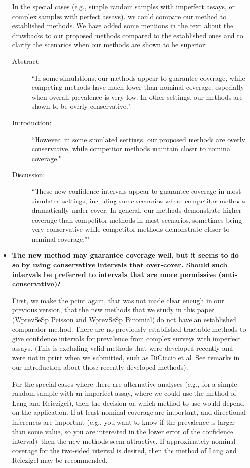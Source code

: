 \documentclass[11pt]{article}
\begin{document}
\begin{itemize}
In the special cases (e.g., simple random samples with imperfect 
assays, or complex samples with perfect assays), we could compare our method to established methods. 
    We have added some mentions in the text about the drawbacks to our proposed methods compared to the established ones and to clarify the scenarios when our methods are shown to be superior:
    
    \begin{description}
\item[    Abstract:]
    ``In some simulations, our methods appear to guarantee coverage, while competing methods have much lower than nominal coverage, especially when overall prevalence is very low. In other settings, our methods are shown to be overly conservative."
    
\item[    Introduction:]
    
    ``However, in some simulated settings, our proposed methods are overly conservative, while competitor methods maintain closer to nominal coverage."

\item[    Discussion:]
    ``These new confidence intervals appear to guarantee coverage in most simulated settings, including some scenarios where competitor methods dramatically under-cover.
    In general, our methods demonstrate higher coverage than competitor methods in most scenarios, sometimes being very conservative while competitor methods demonstrate closer to nominal coverage.""
\end{description}

    \item \textbf{The new method may guarantee coverage well, but it seems to do so by using conservative intervals that over-cover. Should such intervals be preferred to intervals that are more permissive (anti-conservative)?}
    
  First, we make the point again, that was not made clear enough in our previous version, that the new methods that we study in this paper (WprevSeSp Poisson and WprevSeSp Binomial)
do not have an established comparator method.
There are no previously established tractable methods to give confidence intervals for prevalence from complex surveys with imperfect assays.
(This is excluding valid methods that were developed recently and were not in print when we submitted, such as DiCiccio et al.
See remarks in our introduction about those recently developed methods).

For the special cases where there are alternative analyses (e.g., for a simple random sample with an imperfect assay, where we could use the method of Lang and Reiczigel), then the decision on which method to use would depend on the application.
If at least nominal coverage are important, and directional inferences are important (e.g., you want to know if the prevalence is larger than some value, so you are interested in the lower error of the confidence interval), then the new methods seem attractive.
If approximately nominal coverage for the two-sided interval is desired, then the method of Lang and Reiczigel may be recommended. 


\end{itemize}
\end{document}
